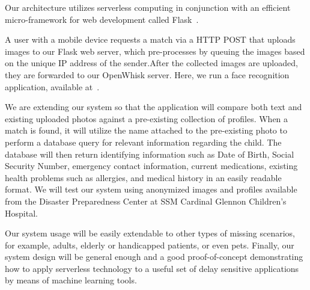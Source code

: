 \documentclass[sigconf]{acmart}
\begin{document}
Our architecture utilizes serverless computing in conjunction with an efficient micro-framework for web development called Flask~\cite{flask}. 

A user with a mobile device requests a match via a HTTP POST that uploads images to our Flask web server, which  pre-processes by queuing the images based on the unique IP address of the sender.After the collected images are uploaded, they are forwarded to our OpenWhisk server. Here, we run a face recognition application, available at~\cite{ageitgey}.  

We are extending our system so that the application will compare both text and existing uploaded photos against a pre-existing collection of profiles. When a match is found, it will utilize the name attached to the pre-existing photo to perform a database query for relevant information regarding the child. The database will then return identifying information such as Date of Birth, Social Security Number, emergency contact information, current medications, existing health problems such as allergies, and medical history in an easily readable format. We will test our system using anonymized images and profiles available from the Disaster Preparedness Center at SSM Cardinal Glennon Children's Hospital.

Our system usage will be easily extendable to other types of missing scenarios, for example, adults, elderly or handicapped patients, or even pets. Finally, our system design will be general enough and a good proof-of-concept demonstrating how to apply serverless technology to a useful set of delay sensitive applications by means of machine learning tools.


\end{document}

